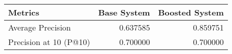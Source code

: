 \begin{tabular}{lrr}
\toprule
Metrics & Base System & Boosted System \\
\midrule
Average Precision & 0.637585 & 0.859751 \\
Precision at 10 (P@10) & 0.700000 & 0.700000 \\
\bottomrule
\end{tabular}
